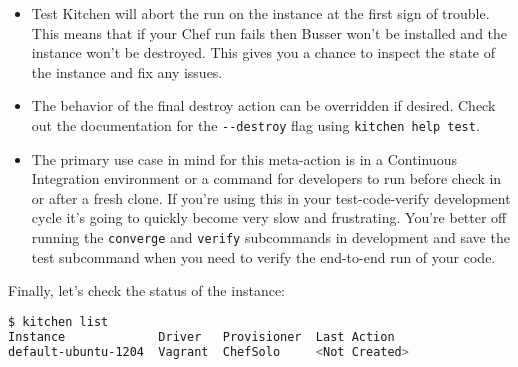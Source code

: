 \begin{itemize}
  \item Test Kitchen will abort the run on the instance at the first sign of trouble. This means that if your Chef run fails then Busser won't be installed and the instance won't be destroyed. This gives you a chance to inspect the state of the instance and fix any issues.
  \item The behavior of the final destroy action can be overridden if desired. Check out the documentation for the \lstinline!--destroy! flag using \lstinline!kitchen help test!.
  \item The primary use case in mind for this meta-action is in a Continuous Integration environment or a command for developers to run before check in or after a fresh clone. If you're using this in your test-code-verify development cycle it's going to quickly become very slow and frustrating. You're better off running the \lstinline!converge! and \lstinline!verify! subcommands in development and save the test subcommand when you need to verify the end-to-end run of your code.
\end{itemize}

Finally, let's check the status of the instance:

\begin{lstlisting}[language=Bash,label=lst:testing-test-kitchen19]
$ kitchen list
Instance             Driver   Provisioner  Last Action
default-ubuntu-1204  Vagrant  ChefSolo     <Not Created>
\end{lstlisting}